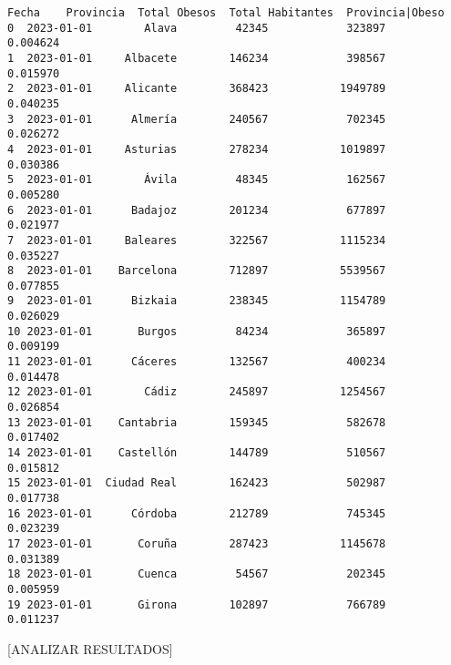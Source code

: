 \documentclass[11pt]{article}
\makeatletter
\newcommand{\boxspacing}{\kern\kvtcb@left@rule\kern\kvtcb@boxsep}
\newcommand{\prompt}[4]{
        {\ttfamily\llap{{\color{#2}[#3]:\hspace{3pt}#4}}\vspace{-\baselineskip}}
    }
\makeatother
\begin{document}
            \begin{tcolorbox}[breakable, size=fbox, boxrule=.5pt, pad at break*=1mm, opacityfill=0]
\prompt{Out}{outcolor}{17}{\boxspacing}
\begin{Verbatim}[commandchars=\\\{\}]
        Fecha    Provincia  Total Obesos  Total Habitantes  Provincia|Obeso
0  2023-01-01        Alava         42345            323897         0.004624
1  2023-01-01     Albacete        146234            398567         0.015970
2  2023-01-01     Alicante        368423           1949789         0.040235
3  2023-01-01      Almería        240567            702345         0.026272
4  2023-01-01     Asturias        278234           1019897         0.030386
5  2023-01-01        Ávila         48345            162567         0.005280
6  2023-01-01      Badajoz        201234            677897         0.021977
7  2023-01-01     Baleares        322567           1115234         0.035227
8  2023-01-01    Barcelona        712897           5539567         0.077855
9  2023-01-01      Bizkaia        238345           1154789         0.026029
10 2023-01-01       Burgos         84234            365897         0.009199
11 2023-01-01      Cáceres        132567            400234         0.014478
12 2023-01-01        Cádiz        245897           1254567         0.026854
13 2023-01-01    Cantabria        159345            582678         0.017402
14 2023-01-01    Castellón        144789            510567         0.015812
15 2023-01-01  Ciudad Real        162423            502987         0.017738
16 2023-01-01      Córdoba        212789            745345         0.023239
17 2023-01-01       Coruña        287423           1145678         0.031389
18 2023-01-01       Cuenca         54567            202345         0.005959
19 2023-01-01       Girona        102897            766789         0.011237
\end{Verbatim}
\end{tcolorbox}
        
    {[}ANALIZAR RESULTADOS{]}


    
    
    
\end{document}
